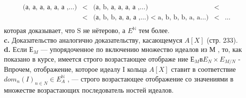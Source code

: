 \documentclass{mai_book}
\begin{document}
			$$\begin{array}{ccccc}
						\text{(а, а, а, а, а, а ,}\ldots) & < & \text{(а, b, а, а, а, а ,}\ldots) & < & \\
																				 & < & \text{(а, b, b, а, а, а ,}\ldots) < \text{a, b, b, b, a, a}\ldots) & < & \ldots \\
			\end{array}$$
которая доказывает, что S не нётерово, а $E^{\mathbb{N}}$ тем более.\\
\hspace*{15pt}\textbf{c.} Доказательство аналогично доказательству, касающемуся $A[X]$\linebreak
(стр. 233).\\
\hspace*{15pt}\textbf{d.} Если $Е_M$ — упорядоченное по включению множество идеалов из\linebreak
М , то, как показано в курсе, имеется строго возрастающее отображе­\linebreak
ние $Е_M в E_N \times E_{M/N}$ - Впрочем, отображение, которое идеалу I кольца\linebreak
$A[X]$ ставит в соответствие $dom_n(I)_{n \in N} \in E^{\mathbb{N}}_A$ , — строго возрастающее\linebreak
отображение со значениями в множестве возрастающих последователь­\linebreak
ностей идеалов.
\end{document}
